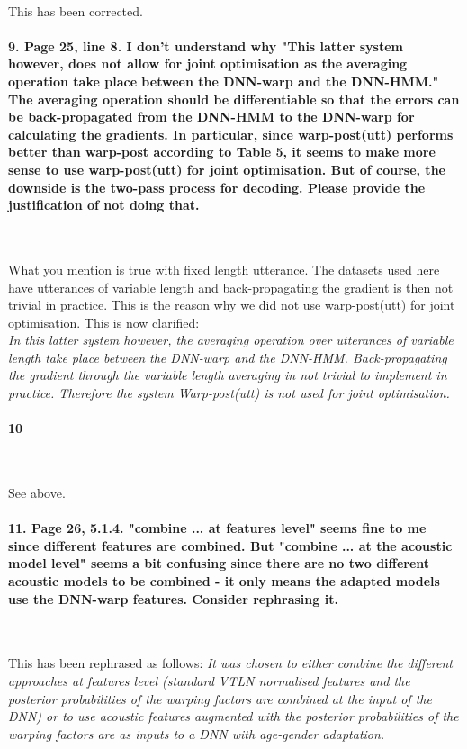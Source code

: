 \documentclass[]{article}
\begin{document}
~

This has been corrected.

\paragraph{9. Page 25, line 8. I don't understand why "This latter system however, does not allow for joint optimisation as the averaging operation take place between the DNN-warp and the DNN-HMM." The averaging operation should be differentiable so that the errors can be back-propagated from the DNN-HMM to the DNN-warp for calculating the gradients. In particular, since warp-post(utt) performs better than warp-post according to Table 5, it seems to make more sense to use warp-post(utt) for joint optimisation. But of course, the downside is the two-pass process for decoding. Please provide the justification of not doing that.}

~

What you mention is true with fixed length utterance. The datasets used here have utterances of variable length and back-propagating the gradient is then not trivial in practice. This is the reason why we did not use warp-post(utt) for joint optimisation. This is now clarified:\\
\textit{In this latter system however, the averaging operation over utterances of variable length take place between the DNN-warp and the DNN-HMM. Back-propagating the gradient through the variable length averaging in not trivial to implement in practice. Therefore the system \textit{Warp-post(utt)} is not used for joint optimisation.}

\paragraph{10}

~

See above.

\paragraph{11. Page 26, 5.1.4. "combine ... at features level" seems fine to me since different features are combined. But "combine ... at the acoustic model level" seems a bit confusing since there are no two different acoustic models to be combined - it only means the adapted models use the DNN-warp features. Consider rephrasing it.}

~

This has been rephrased as follows:
\textit{It was chosen to either combine the different approaches at features level (standard VTLN normalised features and the posterior probabilities of the warping factors are combined at the input of the DNN) or to use acoustic features augmented with the posterior probabilities of the warping factors are as inputs to a DNN with age-gender adaptation.}
\end{document}
